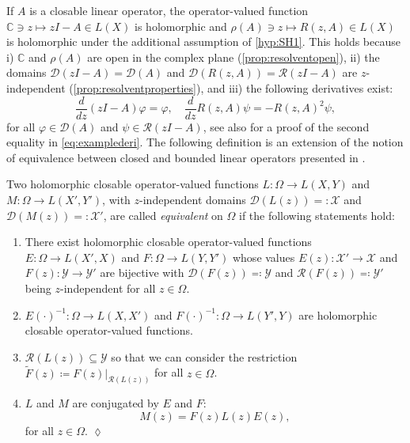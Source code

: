 \documentclass[english]{myarticle}
\begin{document}
\begin{sloppypar}
If $A$ is a closable linear operator, the operator-valued function $\mathbb{C} \ni z \mapsto zI-A \in L(X)$ is holomorphic and $\rho(A) \ni z \mapsto R(z,A) \in L(X)$ is holomorphic under the additional assumption of \ref{hyp:SH1}. This holds because i) $\mathbb{C}$ and $\rho(A)$ are open in the complex plane (\cref{prop:resolventopen}), ii) the domains $\mathcal{D}(zI-A) = \mathcal{D}(A)$ and $\mathcal{D}(R(z,A)) = \mathcal{R}(zI-A)$ are $z$-independent (\cref{prop:resolventproperties}), and iii) the following derivatives exist:
\begin{equation} \label{eq:examplederi}
\frac{d}{dz} (zI-A)\varphi = \varphi, \quad \frac{d}{dz} R(z,A)\psi = -R(z,A)^2 \psi,
\end{equation}
for all $\varphi \in \mathcal{D}(A)$ and $\psi \in \mathcal{R}(zI-A)$, see also \cite[Theorem 5.1-C]{Taylor1986}  for a proof of the second equality in \eqref{eq:examplederi}. The following definition is an extension of the notion of equivalence between closed and bounded linear operators presented in \cite[Section I.1.2]{Kaashoek1992}.

\begin{definition} \label{def:equi}
Two holomorphic closable operator-valued functions $L : \Omega \to L(X,Y)$ and $M : \Omega \to L(X',Y')$, with $z$-independent domains $\mathcal{D}(L(z)) =: \mathcal{X}$ and $\mathcal{D}(M(z)) =: \mathcal{X}'$, are called \emph{equivalent} on $\Omega$ if the following statements hold:
\begin{enumerate}
    \item There exist holomorphic closable operator-valued functions $E : \Omega \to L(X',X)$ and $F : \Omega \to L(Y,Y')$ whose values $E(z) : \mathcal{X}' \to \mathcal{X}$ and $F(z) : \mathcal{Y} \to \mathcal{Y}'$ are bijective with $\mathcal{D}(F(z)) \eqqcolon \mathcal{Y}$ and $\mathcal{R}(F(z)) \eqqcolon \mathcal{Y}'$ being $z$-independent for all $z \in \Omega$.
    \item $E(\cdot)^{-1} : \Omega \to L(X,X')$ and $F(\cdot)^{-1} : \Omega \to L(Y',Y)$ are holomorphic closable operator-valued functions.
    \item $\mathcal{R}(L(z)) \subseteq \mathcal{Y}$ so that we can consider the restriction $\tilde{F}(z) \coloneqq F(z)|_{\mathcal{R}(L(z))}$ for all $z \in \Omega$.
    \item $L$ and $M$ are conjugated by $E$ and $F$:
    \begin{equation} \label{eq:equivalenceM}
        M(z) = F(z)L(z)E(z), 
    \end{equation}
    for all $z \in \Omega$. \hfill $\lozenge$
\end{enumerate}
\end{definition}


\end{sloppypar}
\end{document}
